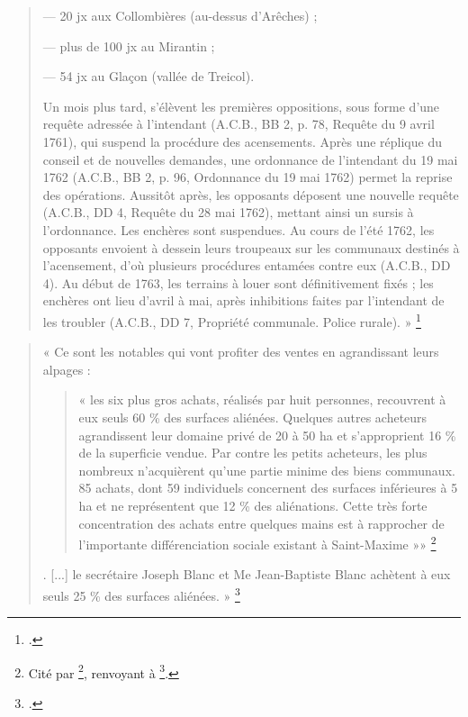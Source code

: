 \documentclass[12pt,a4paper]{report}
\begin{document}
\begin{quote}
	— 20 jx aux Collombières (au-dessus d'Arêches) ;
	
	— plus de 100 jx au Mirantin ;
	
	— 54 jx au Glaçon (vallée de Treicol).
	
	Un mois plus tard, s'élèvent les premières oppositions, sous forme d'une requête adressée à l'intendant (A.C.B., BB 2, p. 78, Requête du 9 avril 1761), qui suspend la procédure des acensements. Après une réplique du conseil et de nouvelles demandes, une ordonnance de l'intendant du 19 mai 1762 (A.C.B., BB 2, p. 96, Ordonnance du 19 mai 1762) permet la reprise des opérations. Aussitôt après, les opposants déposent une nouvelle requête (A.C.B., DD 4, Requête du 28 mai 1762), mettant ainsi un sursis à l'ordonnance. Les enchères sont suspendues. Au cours de l'été 1762, les opposants envoient à dessein leurs troupeaux sur les communaux destinés à l'acensement, d'où plusieurs procédures entamées contre eux (A.C.B., DD 4). Au début de 1763, les terrains à louer sont définitivement fixés ; les enchères ont lieu d'avril à mai, après inhibitions faites par l'intendant de les troubler (A.C.B., DD 7, Propriété communale. Police rurale). »
	\footcite[70--71]{HViallet1993}
\end{quote}

\begin{quote}
	« Ce sont les notables qui vont profiter des ventes en agrandissant leurs alpages : 
	\begin{quote}« les six plus gros achats, réalisés par huit personnes, recouvrent à eux seuls 60 \% des surfaces aliénées. Quelques autres acheteurs agrandissent leur domaine privé de 20 à 50 ha et s'approprient 16 \% de la superficie vendue. Par contre les petits acheteurs, les plus nombreux n'acquièrent qu'une partie minime des biens communaux. 85 achats, dont 59 individuels concernent des surfaces inférieures à 5 ha et ne représentent que 12 \% des aliénations. Cette très forte concentration des achats entre quelques mains est à rapprocher de l'importante différenciation sociale existant à Saint-Maxime »»%
		\footnote{Cité par \footcite[79]{HViallet1993}, renvoyant à \footcite[188]{Fleury1985CommunalBeaufort}.}
	\end{quote}
	. [...] le secrétaire Joseph Blanc et Me Jean-Baptiste Blanc achètent à eux seuls 25 \% des surfaces aliénées. »
	\footcite[79]{HViallet1993}
\end{quote}
\end{document}
